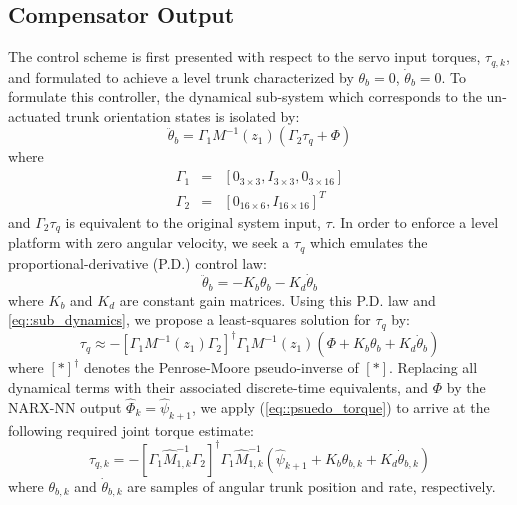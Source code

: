 		\subsection{Compensator Output}

			The control scheme is first presented with respect to the servo input torques, $\tau_{q,k}$, and formulated to achieve a level trunk characterized by $\theta_{b}=0$, $\dot{\theta}_{b}= 0$. To formulate this controller, the dynamical sub-system which corresponds to the un-actuated trunk orientation states is isolated by:
				\begin{equation}
					\ddot{\theta}_{b} 	= \Gamma_{1} M^{-1}(z_{1})( \Gamma_{2}\tau_{q}	 + \Phi)
					\label{eq::sub_dynamics}
				\end{equation}
			where 
				\begin{eqnarray*}
					\Gamma_{1} &=& [0_{3\times3},I_{3\times3},0_{3\times16}] \nonumber\\
					\Gamma_{2} &=& [0_{16\times6},I_{16\times16}]^{T}	
				\end{eqnarray*}
			and $\Gamma_{2}\tau_{q}$ is equivalent to the original system input, $\tau$. In order to enforce a level platform with zero angular velocity, we seek a $\tau_{q}$ which emulates the proportional-derivative (P.D.) control law:
				\begin{equation}
				 	\ddot{\theta}_{b} = - K_{b}{\theta}_{b} - K_{d}\dot{\theta}_{b}
				\end{equation}
			where $K_{b}$ and $K_{d}$ are constant gain matrices. Using this P.D. law and \ref{eq::sub_dynamics}, we propose a least-squares solution for $\tau_{q}$ by:
				\begin{equation}
					\tau_{q} \approx -\left[\Gamma_{1} M^{-1}(z_{1}) \Gamma_{2}\right]^{\dagger}\Gamma_{1} M^{-1}(z_{1})(\Phi + K_{b}{\theta}_{b} + K_{d}\dot{\theta}_{b} )
					\label{eq::psuedo_torque}
				\end{equation}
			where $\left[*\right]^{\dagger}$ denotes the Penrose-Moore pseudo-inverse of $[*]$.
			Replacing all dynamical terms with their associated discrete-time equivalents, and $\Phi$ by the NARX-NN output $\hat{\Phi}_{k}=\hat{\psi}_{k+1}$, we apply (\ref{eq::psuedo_torque}) to arrive at the following required joint torque estimate:
				\begin{equation}
					\hat{\tau}_{q,k} =  -\left[\Gamma_{1} \hat{M}^{-1}_{1,k} \Gamma_{2}\right]^{\dagger} \Gamma_{1}\hat{M}^{-1}_{1,k}( \hat{\psi}_{k+1} + K_{b}{\theta}_{b,k} + K_{d}\dot{\theta}_{b,k} )
					\label{eq::psuedo_torque_k}
				\end{equation}
			where ${\theta}_{b,k}$ and $\dot{\theta}_{b,k}$ are samples of angular trunk position and rate, respectively.


